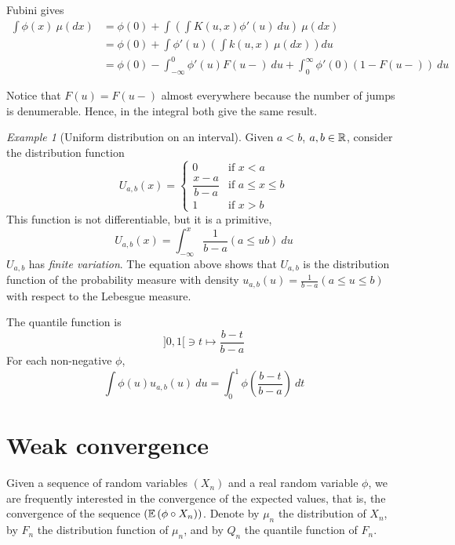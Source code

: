 \documentclass[12pt,a4paper]{amsart}
\theoremstyle{plain}%
\theoremstyle{definition}
\theoremstyle{remark}
\newtheorem{example}{Example}
\begin{document}
Fubini gives
\begin{align*}
    \int \phi(x) \ \mu(dx) &= \phi(0) + \int \left( \int K(u,x) \phi'(u) \ du\right) \ \mu(dx) \\
    &= \phi(0) + \int \phi'(u) \left(\int k(u,x) \ \mu(dx) \right) du \\  &= \phi(0) - \int_{-\infty}^0 \phi'(u) F(u-) \ du + \int_0^{\infty} \phi'(0) (1 - F(u-)) \ du 
\end{align*}

Notice that $F(u) = F(u-)$ almost everywhere because the number of jumps is denumerable. Hence, in the integral both give the same result.

\begin{example}
[Uniform distribution on an interval] Given $a < b$, $a,b \in \mathbb{R}$, consider the distribution function
\begin{equation*}
U_{a,b}(x) = \begin{cases}
  0 & \text{if $x < a$} \\
  \dfrac{x-a}{b-a} & \text{if $a \leq x \leq b$} \\
  1 & \text{if $x > b$}
\end{cases}
\end{equation*}
This function is not differentiable, but it is a primitive,
\begin{equation*}
    U_{a,b}(x) = \int_{-\infty}^x \frac1{b-a} (a \leq u b) \ du
\end{equation*}
$U_{a,b}$ has \emph{finite variation}. The equation above shows that $U_{a,b}$ is the distribution function of the probability measure with density $u_{a,b}(u) = \frac1{b-a} (a \leq u \leq b)$ with respect to the Lebesgue measure.

The quantile function is
\begin{equation*}
    ]0,1[ \ni t \mapsto \frac {b - t}{b-a}
\end{equation*}
For each non-negative $\phi$,
\begin{equation*}
\int \phi(u) u_{a,b}(u) \ du = \int_0^1 \phi\left(\frac{b-t}{b-a}\right)  \ dt  
\end{equation*}
\end{example}

\section{Weak convergence}
\label{sec:weak-convergence}

Given a sequence of random variables $(X_n)$ and a real random variable $\phi$, we are frequently interested in the convergence of the expected values, that is, the convergence of the sequence $(\operatorname{\mathbb E}\left(\phi \circ X_n\right))$. Denote by $\mu_n$ the distribution of $X_n$, by $F_n$ the distribution function of $\mu_n$, and by $Q_n$ the quantile function of $F_n$.
\end{document}
